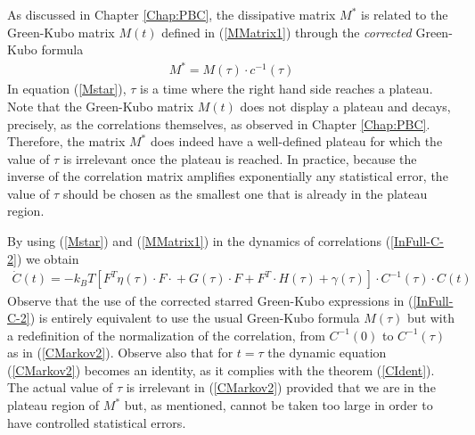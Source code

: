 \documentclass[b5paper,openright,10pt]{book}
\newcommand{\esc}{\!\cdot\!}
\begin{document}
As  discussed  in Chapter \ref{Chap:PBC},
the  dissipative matrix  $M^*$  is
related to  the Green-Kubo  matrix $M(t)$ defined  in (\ref{MMatrix1})
through the \textit{corrected} Green-Kubo formula
\begin{align}
  M^*=M(\tau)\esc c^{-1}(\tau)
\label{Mstar}
\end{align}
In  equation  (\ref{Mstar}),
$\tau$ is  a time where  the right hand  side reaches a  plateau. Note
that  the Green-Kubo  matrix $M(t)$  does  not display  a plateau  and
decays,  precisely, as  the  correlations themselves,  as observed  in
Chapter \ref{Chap:PBC}.  Therefore,  the  matrix  $M^*$  does  indeed  have  a
well-defined plateau for which the  value of $\tau$ is irrelevant once
the  plateau is  reached.  In  practice,  because the  inverse of  the
correlation matrix amplifies exponentially  any statistical error, the
value of $\tau$  should be chosen as the smallest  one that is already
in the plateau region.

By   using    (\ref{Mstar}) and (\ref{MMatrix1})   in   the   dynamics    of   correlations
(\ref{InFull-C-2}) we obtain
\begin{align}
  \dot{C}(t) =
-k_BT\left[{F}^T{\eta}(\tau)\esc{F}\esc  +{G}(\tau)\esc F+F^T\esc{H}(\tau)+{\gamma}(\tau)\right]
\esc C^{-1}(\tau) \esc C(t)
\label{CMarkov2}
\end{align}
Observe that the  use of the corrected starred  Green-Kubo expressions in
(\ref{InFull-C-2}) is  entirely equivalent  to use the  usual Green-Kubo
formula $M(\tau)$ but with a redefinition of the normalization of the
correlation,    from    $C^{-1}(0)$    to   $C^{-1}(\tau)$    as    in
(\ref{CMarkov2}).   Observe  also  that  for  $t=\tau$  the  dynamic
equation (\ref{CMarkov2}) becomes an identity, as  it complies with  the theorem
(\ref{CIdent}).   The   actual  value  of  $\tau$   is  irrelevant  in
(\ref{CMarkov2}) provided that  we are in the plateau  region of $M^*$
but,  as  mentioned, cannot  be  taken  too  large  in order  to  have
controlled statistical errors.
\end{document}
